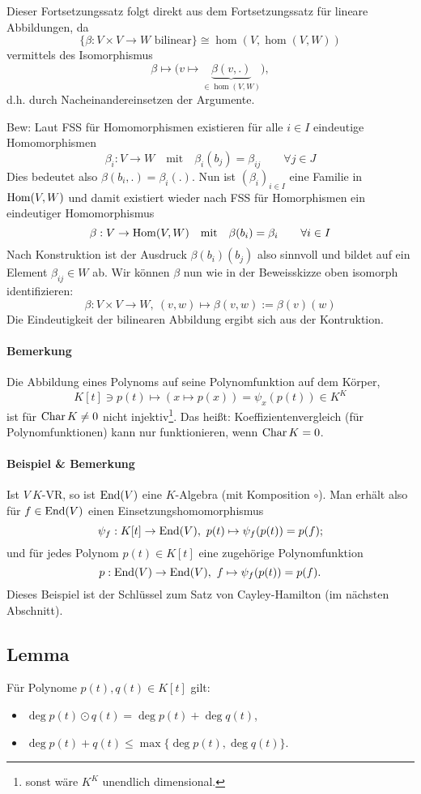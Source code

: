 	Dieser Fortsetzungssatz folgt direkt aus dem Fortsetzungssatz für lineare Abbildungen, da
		\[ \{\beta:V\times V\to W \text{ bilinear}\} \cong \hom(V,\hom(V,W))\]
	vermittels des Isomorphismus
		\[ \beta \mapsto \big(v\mapsto\underset{\in \hom(V,W)}{\underbrace{\beta(v,.)}}\big), \]
	d.h. durch Nacheinandereinsetzen der Argumente.
	
	Bew: Laut FSS für Homomorphismen existieren für alle $i\in I$ eindeutige Homomorphismen
		\[\beta_i:V\to W \quad\text{mit}\quad \beta_i(b_j)=\beta_{ij} \qquad\forall j\in J \]
	Dies bedeutet also $\beta(b_i,.)=\beta_i(.)$. Nun ist $(\beta_i)_{i\in I}$ eine Familie in $\operatorname{Hom}(V,W)$ und damit existiert wieder nach FSS für Homorphismen ein eindeutiger Homomorphismus
		\[\beta:V\to \operatorname{Hom}(V,W) \quad\text{mit}\quad \beta(b_i)=\beta_i \qquad\forall i\in I\]
	Nach Konstruktion ist der Ausdruck $\beta(b_i)(b_j)$ also sinnvoll und bildet auf ein Element $\beta_{ij}\in W$ ab. Wir können $\beta$ nun wie in der Beweisskizze oben isomorph identifizieren:
		\[\beta: V\times V \to W,\ (v,w)\mapsto \beta(v,w):=\beta(v)(w)\]
	Die Eindeutigkeit der bilinearen Abbildung ergibt sich aus der Kontruktion.
	
\paragraph{Bemerkung}
	Die Abbildung eines Polynoms auf seine Polynomfunktion auf dem Körper,
		\[ K[t]\ni p(t)\mapsto (x\mapsto p(x))=\psi_x(p(t))\in K^K \]
	ist für $ \operatorname{Char} K\neq 0 $ nicht injektiv\footnote{sonst wäre $K^K$ unendlich dimensional.}. Das heißt: Koeffizientenvergleich (für Polynomfunktionen) kann nur funktionieren, wenn $ \operatorname{Char} K = 0 $.
\paragraph{Beispiel \& Bemerkung}
	Ist $ V\ K $-VR, so ist $ \operatorname{End}(V) $ eine $ K $-Algebra (mit Komposition $ \circ $). Man erhält also für $ f\in \operatorname{End}(V) $ einen Einsetzungshomomorphismus
		\[ \psi_f: K[t]\to \operatorname{End}(V),\ p(t) \mapsto \psi_f(p(t)) = p(f); \]
	und für jedes Polynom $ p(t)\in K[t] $ eine zugehörige Polynomfunktion
		\[ p: \operatorname{End}(V)\to\operatorname{End}(V),\ f\mapsto \psi_f(p(t))= p(f). \]
	Dieses Beispiel ist der Schlüssel zum Satz von Cayley-Hamilton (im nächsten Abschnitt).
\subsection{Lemma}
	\begin{Lemma}
		Für Polynome $ p(t), q(t)\in K[t] $ gilt:
			\begin{itemize}
				\item $ \deg p(t)\odot q(t) = \deg p(t)+\deg q(t) $,
				\item $ \deg p(t)+q(t) \leq \max\{\deg p(t), \deg q(t)\} $.
			\end{itemize}
	\end{Lemma}
